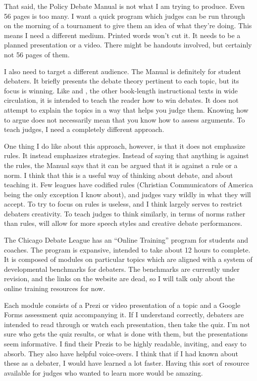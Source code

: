 \documentclass[man,12pt,natbib]{apa6}
\begin{document}
That said, the Policy Debate Manual is not what I am trying to produce. Even 56
pages is too many. I want a quick program which judges can be run through on
the morning of a tournament to give them an idea of what they're doing. This
means I need a different medium. Printed words won't cut it. It needs to be a
planned presentation or a video. There might be handouts involved, but
certainly not 56 pages of them.

I also need to target a different audience. The Manual is definitely for
student debaters. It briefly presents the debate theory pertinent to each
topic, but its focus is winning. Like \citet{Bruschke95} and
\citet{Snowball94}, the other book-length instructional texts in wide
circulation, it is intended to teach the reader how to win debates. It does not
attempt to explain the topics in a way that helps you judge them. Knowing how
to argue does not necessarily mean that you know how to assess arguments. To
teach judges, I need a completely different approach.

One thing I do like about this approach, however, is that it does not emphasize
rules. It instead emphasizes strategies. Instead of saying that anything is
against the rules, the Manual says that it can be argued that it is against a
rule or a norm. 
I think that this is a useful way of thinking about debate, and about teaching
it. Few leagues have codified rules (Christian Communicators of America being
the only exception I know about), and judges vary wildly in what they will
accept. To try to focus on rules is useless, and I think largely serves to
restrict debaters creativity. To teach judges to think similarly, in terms of
norms rather than rules, will allow for more speech styles and creative debate
performances.


The Chicago Debate League has an ``Online Training'' program for students and
coaches. The program is expansive, intended to take about 12 hours to complete.
It is composed of modules on particular topics which are aligned with a system
of developmental benchmarks for debaters. The benchmarks are currently under
revision, and the links on the website are dead, so I will talk only about the
online training resources for now.

Each module consists of a Prezi or video presentation of a topic and a Google
Forms assessment quiz accompanying it. If I understand correctly, debaters are
intended to read through or watch each presentation, then take the quiz. I'm
not sure who gets the quiz results, or what is done with them, but the
presentations seem informative. I find their Prezis to be highly readable,
inviting, and easy to absorb. They also have helpful voice-overs. I think that
if I had known about these as a debater, I would have learned a lot faster.
Having this sort of resource available for judges who wanted to learn more
would be amazing.
\end{document}
